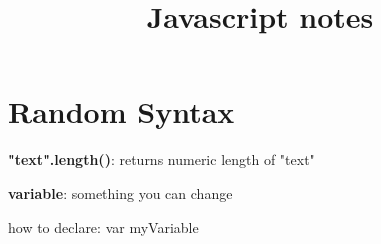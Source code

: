 \documentclass[12pt]{article}
\title{Javascript notes}
\begin{document}
\maketitle
\section{Random Syntax}
\textbf{"text".length()}: returns numeric length of "text"


\textbf{variable}: something you can change
\begin{description}
\item[how to declare: var myVariable]

\end{description}
\end{document}
